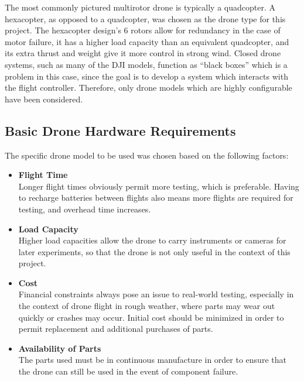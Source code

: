 \label{section:hexacopter_design}


The most commonly pictured multirotor drone is typically a quadcopter. A hexacopter, as opposed to a quadcopter, was chosen as the drone type for this project. The hexacopter design's 6 rotors allow for redundancy in the case of motor failure, it has a higher load capacity than an equivalent quadcopter, and its extra thrust and weight give it more control in strong wind. Closed drone systems, such as many of the DJI models, function as ``black boxes'' which is a problem in this case, since the goal is to develop a system which interacts with the flight controller. Therefore, only drone models which are highly configurable have been considered. 

\subsection{Basic Drone Hardware Requirements}

The specific drone model to be used was chosen based on the following factors:
\begin{itemize}
    \item \textbf{Flight Time} \\ Longer flight times obviously permit more testing, which is preferable. Having to recharge batteries between flights also means more flights are required for testing, and overhead time increases.
    \item \textbf{Load Capacity} \\ Higher load capacities allow the drone to carry instruments or cameras for later experiments, so that the drone is not only useful in the context of this project.
    \item \textbf{Cost} \\ Financial constraints always pose an issue to real-world testing, especially in the context of drone flight in rough weather, where parts may wear out quickly or crashes may occur. Initial cost should be minimized in order to permit replacement and additional purchases of parts.
    \item \textbf{Availability of Parts} \\ The parts used must be in continuous manufacture in order to ensure that the drone can still be used in the event of component failure.
\end{itemize}

